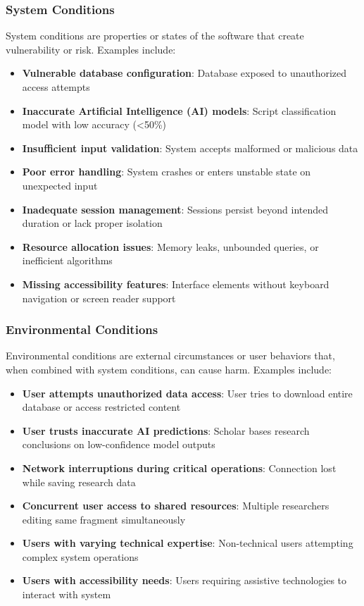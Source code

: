 \documentclass{article}
\begin{document}
\subsubsection{System Conditions}

System conditions are properties or states of the software that create vulnerability or risk. Examples include:

\begin{itemize}
\item \textbf{Vulnerable database configuration}: Database exposed to unauthorized access attempts
\item \textbf{Inaccurate Artificial Intelligence (AI) models}: Script classification model with low accuracy (<50\%)
\item \textbf{Insufficient input validation}: System accepts malformed or malicious data
\item \textbf{Poor error handling}: System crashes or enters unstable state on unexpected input
\item \textbf{Inadequate session management}: Sessions persist beyond intended duration or lack proper isolation
\item \textbf{Resource allocation issues}: Memory leaks, unbounded queries, or inefficient algorithms
\item \textbf{Missing accessibility features}: Interface elements without keyboard navigation or screen reader support
\end{itemize}

\subsubsection{Environmental Conditions}

Environmental conditions are external circumstances or user behaviors that, when combined with system conditions, can cause harm. Examples include:

\begin{itemize}
\item \textbf{User attempts unauthorized data access}: User tries to download entire database or access restricted content
\item \textbf{User trusts inaccurate AI predictions}: Scholar bases research conclusions on low-confidence model outputs
\item \textbf{Network interruptions during critical operations}: Connection lost while saving research data
\item \textbf{Concurrent user access to shared resources}: Multiple researchers editing same fragment simultaneously
\item \textbf{Users with varying technical expertise}: Non-technical users attempting complex system operations
\item \textbf{Users with accessibility needs}: Users requiring assistive technologies to interact with system
\end{itemize}
\end{document}

